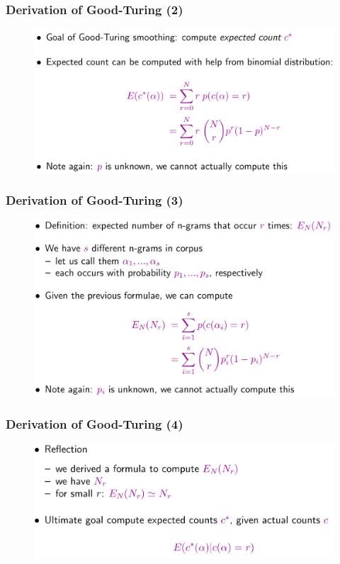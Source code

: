 \documentclass{beamer}
\begin{document}
\begin{frame}\frametitle{Derivation of Good-Turing (2)}
\begin{figure}
\includegraphics[width=0.9\linewidth]{figure/derivation_good_turing_2.pdf}
\end{figure}
\end{frame}


\begin{frame}\frametitle{Derivation of Good-Turing (3)}
\begin{figure}
\includegraphics[width=0.9\linewidth]{figure/derivation_good_turing_3.pdf}
\end{figure}
\end{frame}


\begin{frame}\frametitle{Derivation of Good-Turing (4)}
\begin{figure}
\includegraphics[width=0.9\linewidth]{figure/derivation_good_turing_4.pdf}
\end{figure}
\end{frame}
\end{document}

